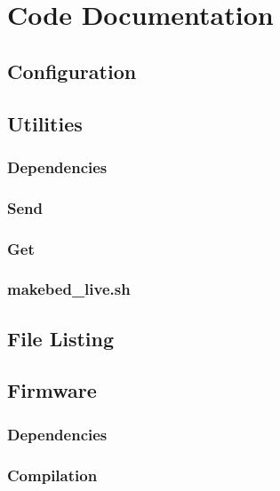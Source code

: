 \chapter{Code Documentation}
	
	\section{Configuration}
	
	\section{Utilities}
		
		\label{sec:utilDoc}
		
		\subsection{Dependencies}
		
		\subsection{Send}
		
			\label{sec:makebedDoc}
			
		
		\subsection{Get}
		
		\subsection{makebed\_live.sh}
			
			\label{sec:makebedliveDoc}
	
	\section{File Listing}
	
	\section{Firmware}
	
		\subsection{Dependencies}
		
		\subsection{Compilation}
			\label{sec:compilation}
	
